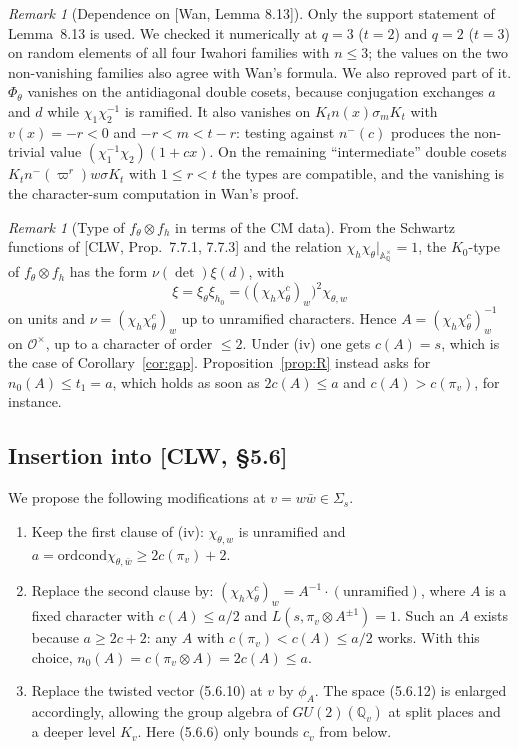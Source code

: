 \documentclass[11pt]{amsart}
\theoremstyle{definition}
\theoremstyle{remark}
\newtheorem{remark}[theorem]{Remark}
\newcommand{\Q}{\mathbb{Q}}
\newcommand{\cO}{\mathcal{O}}
\newcommand{\cond}{\mathrm{cond}}
\newcommand{\vp}{\varpi}
\newcommand{\nm}{n^{-}}
\begin{document}
\begin{remark}[Dependence on {[Wan, Lemma 8.13]}]\label{rem:813}
Only the support statement of Lemma~8.13 is used. We checked it numerically at $q=3$ ($t=2$) and $q=2$ ($t=3$) on random elements of all four Iwahori families with $n\le3$; the values on the two non-vanishing families also agree with Wan's formula. We also reproved part of it. $\Phi_\theta$ vanishes on the antidiagonal double cosets, because conjugation exchanges $a$ and $d$ while $\chi_1\chi_2^{-1}$ is ramified. It also vanishes on $K_tn(x)\sigma_mK_t$ with $v(x)=-r<0$ and $-r<m<t-r$: testing against $\nm(c)$ produces the non-trivial value $(\chi_1^{-1}\chi_2)(1+cx)$. On the remaining ``intermediate'' double cosets $K_t\nm(\vp^r)w\sigma K_t$ with $1\le r<t$ the types are compatible, and the vanishing is the character-sum computation in Wan's proof.
\end{remark}

\begin{remark}[Type of $f_\theta\otimes f_h$ in terms of the CM data]\label{rem:typeA}
From the Schwartz functions of [CLW, Prop.~7.7.1, 7.7.3] and the relation $\chi_h\chi_\theta|_{\mathbb A_\Q^\times}=1$, the $K_0$-type of $f_\theta\otimes f_h$ has the form $\nu(\det)\xi(d)$, with
\[\xi=\xi_\theta\xi_{h_0}=\big((\chi_h\chi_\theta^c)_w\big)^2\chi_{\theta,w}\]
on units and $\nu=(\chi_h\chi_\theta^c)_w$ up to unramified characters. Hence $A=(\chi_h\chi_\theta^c)_w^{-1}$ on $\cO^\times$, up to a character of order $\le2$. Under (iv) one gets $c(A)=s$, which is the case of Corollary~\ref{cor:gap}. Proposition~\ref{prop:R} instead asks for $n_0(A)\le t_1=a$, which holds as soon as $2c(A)\le a$ and $c(A)>c(\pi_v)$, for instance.
\end{remark}

\subsection{Insertion into [CLW, \S 5.6]}\label{subsec:insert}
We propose the following modifications at $v=w\bar w\in\Sigma_s$.
\begin{enumerate}[label=(\roman*$'$)]
\item Keep the first clause of (iv): $\chi_{\theta,w}$ is unramified and $a=\mathrm{ord}\cond\chi_{\theta,\bar w}\ge 2c(\pi_v)+2$.
\item Replace the second clause by: $(\chi_h\chi_\theta^c)_w=A^{-1}\cdot(\text{unramified})$, where $A$ is a fixed character with $c(A)\le a/2$ and $L(s,\pi_v\otimes A^{\pm1})=1$. Such an $A$ exists because $a\ge 2c+2$: any $A$ with $c(\pi_v)<c(A)\le a/2$ works. With this choice, $n_0(A)=c(\pi_v\otimes A)=2c(A)\le a$.
\item Replace the twisted vector (5.6.10) at $v$ by $\phi_{A}$. The space (5.6.12) is enlarged accordingly, allowing the group algebra of $GU(2)(\Q_v)$ at split places and a deeper level $K_v$. Here (5.6.6) only bounds $c_v$ from below.
\end{enumerate}
\end{document}
